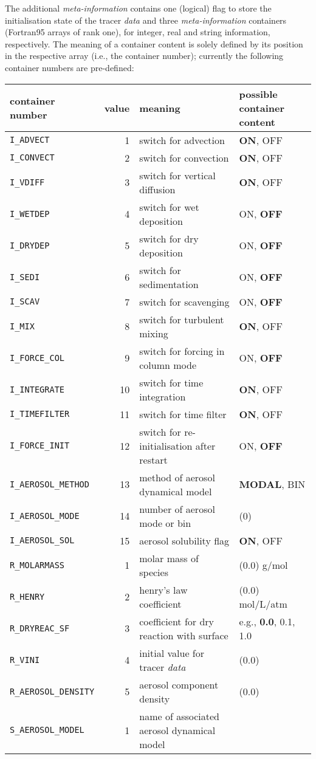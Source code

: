 \documentclass[twoside]{article}
\begin{document}
The additional {\it meta-information} contains one (logical) flag
to store the initialisation state of the tracer {\it data} and
three {\it meta-information} containers (Fortran95 arrays of rank one), 
for integer, real and string information, respectively. 
The meaning of a container content is solely defined by its position in the 
respective array (i.e., the container number); 
currently the following container numbers are pre-defined:

%
\begin{tabular*}{\textwidth}{@{\extracolsep\fill}|lrll|}
\hline
container number & value    & meaning & possible container content \\
\hline
{\tt I\_ADVECT}       & 1   & switch for advection & {\bf ON}, OFF\\
{\tt I\_CONVECT}      & 2   & switch for convection & {\bf ON}, OFF\\
{\tt I\_VDIFF}        & 3   & switch for vertical diffusion & {\bf ON}, OFF\\
{\tt I\_WETDEP}       & 4   & switch for wet deposition & ON, {\bf OFF}\\
{\tt I\_DRYDEP}       & 5   & switch for dry deposition & ON, {\bf OFF}\\
{\tt I\_SEDI}         & 6   & switch for sedimentation & ON, {\bf OFF}\\
{\tt I\_SCAV}         & 7   & switch for scavenging & ON, {\bf OFF}\\
{\tt I\_MIX}          & 8   & switch for turbulent mixing & {\bf ON}, OFF\\
{\tt I\_FORCE\_COL}   & 9   & switch for forcing in column mode & ON, {\bf OFF}\\
{\tt I\_INTEGRATE}    &10   & switch for time integration & {\bf ON}, OFF\\
{\tt I\_TIMEFILTER}   &11   & switch for time filter & {\bf ON}, OFF\\
{\tt I\_FORCE\_INIT}  &12   & switch for re-initialisation after restart & ON, {\bf OFF}\\
{\tt I\_AEROSOL\_METHOD} &13 & method of aerosol dynamical model & {\bf MODAL}, BIN\\
{\tt I\_AEROSOL\_MODE}   &14 & number of aerosol mode or bin & (0)\\
{\tt I\_AEROSOL\_SOL}    &15 & aerosol solubility flag & {\bf ON}, OFF\\
\hline
{\tt R\_MOLARMASS}       & 1 & molar mass of species & (0.0) g/mol\\
{\tt R\_HENRY}           & 2 & henry's law coefficient & (0.0) mol/L/atm\\
{\tt R\_DRYREAC\_SF}     & 3 & coefficient for dry reaction with surface & e.g., {\bf 0.0}, 0.1, 1.0\\
{\tt R\_VINI}            & 4 & initial value for tracer {\it data}& (0.0)\\
{\tt R\_AEROSOL\_DENSITY} & 5 & aerosol component density & (0.0)\\
\hline
{\tt S\_AEROSOL\_MODEL} & 1 & name of associated aerosol dynamical model & \\
\hline
\end{tabular*}
%
\end{document}
